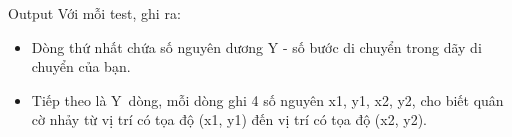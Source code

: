 Output
Với mỗi test, ghi ra:  
\begin{itemize}
	\item     Dòng thứ nhất chứa số nguyên dương Y - số bước di chuyển trong dãy di chuyển của bạn.   
	\item     Tiếp theo là Y dòng, mỗi dòng ghi 4 số nguyên x1, y1, x2, y2, cho biết quân cờ nhảy từ vị trí có tọa độ (x1, y1) đến vị trí có tọa độ (x2, y2).   
\end{itemize}